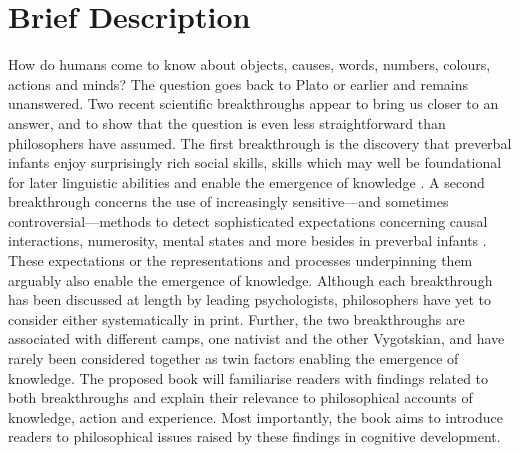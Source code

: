 \documentclass[12pt,\papersize]{extarticle}
\date{}
\begin{document}
\setlength\footnotesep{1em}




\maketitle



\section{Brief Description}
How do humans come to know about %
objects,
causes,
words,
numbers,
colours,
actions
and
minds? 
The question goes back to Plato or earlier and remains unanswered.
Two recent scientific breakthroughs appear to bring us closer to an answer, and to show that the question is even less straightforward than philosophers have  assumed.
The first breakthrough is the discovery that preverbal infants enjoy surprisingly rich social skills, skills which
may well be foundational for later linguistic abilities and enable the emergence of knowledge \citep[e.g.][]{Csibra:2009xr,Meltzoff:2007pj,Tomasello:2005wx}. 
A second breakthrough concerns the use of increasingly sensitive---and sometimes controversial---methods to detect  sophisticated expectations concerning  causal interactions, numerosity, mental states and more besides in preverbal infants \citep[e.g.][]{Spelke:1990jn,Baillargeon:gx}.
These expectations or the representations and processes underpinning them arguably also enable the emergence of knowledge. 
Although each breakthrough has been discussed at length by leading psychologists, philosophers have yet to consider either systematically in print.
Further, the two breakthroughs are associated with different camps, one nativist and the other Vygotskian, and have rarely been considered together as twin factors enabling the emergence of knowledge.
The proposed book will familiarise readers with findings related to both breakthroughs and explain their relevance to philosophical accounts of knowledge, action and experience.  
Most importantly, the book aims to introduce readers to  philosophical issues raised by these findings in cognitive development.
\end{document}
